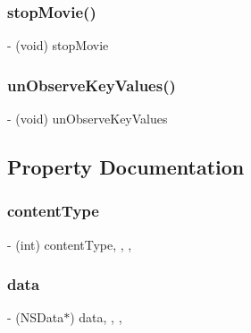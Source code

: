 \subsubsection{\texorpdfstring{stop\+Movie()}{stopMovie()}}
{\footnotesize\ttfamily -\/ (void) stop\+Movie \begin{DoxyParamCaption}{ }\end{DoxyParamCaption}}

\hypertarget{interface_content_displayer_a83192dc0784c16bd36fcd44d9483cd57}{}\label{interface_content_displayer_a83192dc0784c16bd36fcd44d9483cd57} 
\subsubsection{\texorpdfstring{un\+Observe\+Key\+Values()}{unObserveKeyValues()}}
{\footnotesize\ttfamily -\/ (void) un\+Observe\+Key\+Values \begin{DoxyParamCaption}{ }\end{DoxyParamCaption}}



\subsection{Property Documentation}
\hypertarget{interface_content_displayer_a0d19b1773442e481626b142d0a23fe72}{}\label{interface_content_displayer_a0d19b1773442e481626b142d0a23fe72} 
\subsubsection{\texorpdfstring{content\+Type}{contentType}}
{\footnotesize\ttfamily -\/ (int) content\+Type\hspace{0.3cm}{\ttfamily [read]}, {\ttfamily [write]}, {\ttfamily [nonatomic]}, {\ttfamily [assign]}}

\hypertarget{interface_content_displayer_a271c75b6c7eae098d25223b989e78e9e}{}\label{interface_content_displayer_a271c75b6c7eae098d25223b989e78e9e} 
\subsubsection{\texorpdfstring{data}{data}}
{\footnotesize\ttfamily -\/ (N\+S\+Data$\ast$) data\hspace{0.3cm}{\ttfamily [read]}, {\ttfamily [write]}, {\ttfamily [nonatomic]}, {\ttfamily [weak]}}

